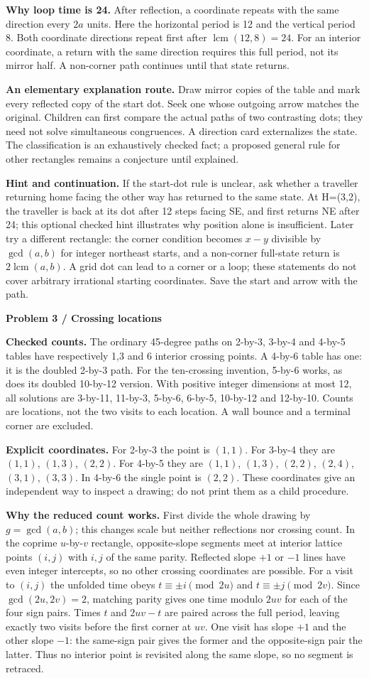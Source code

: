 \documentclass[11pt]{article}
\newcommand{\parttitle}[1]{{\large\bfseries\color{ink}#1}\par}
\newcommand{\labelled}[2]{\textbf{#1} #2\par}
\begin{document}
\labelled{Why loop time is 24.}{After reflection, a coordinate repeats with the same direction every $2a$ units. Here the horizontal period is 12 and the vertical period 8. Both coordinate directions repeat first after $\operatorname{lcm}(12,8)=24$. For an interior coordinate, a return with the same direction requires this full period, not its mirror half. A non-corner path continues until that state returns.}
\labelled{An elementary explanation route.}{Draw mirror copies of the table and mark every reflected copy of the start dot. Seek one whose outgoing arrow matches the original. Children can first compare the actual paths of two contrasting dots; they need not solve simultaneous congruences. A direction card externalizes the state. The classification is an exhaustively checked fact; a proposed general rule for other rectangles remains a conjecture until explained.}
\labelled{Hint and continuation.}{If the start-dot rule is unclear, ask whether a traveller returning home facing the other way has returned to the same state. At H=(3,2), the traveller is back at its dot after 12 steps facing SE, and first returns NE after 24; this optional checked hint illustrates why position alone is insufficient. Later try a different rectangle: the corner condition becomes $x-y$ divisible by $\gcd(a,b)$ for integer northeast starts, and a non-corner full-state return is $2\operatorname{lcm}(a,b)$. A grid dot can lead to a corner or a loop; these statements do not cover arbitrary irrational starting coordinates. Save the start and arrow with the path.}
\newpage
\parttitle{Problem 3 / Crossing locations}
\labelled{Checked counts.}{The ordinary 45-degree paths on 2-by-3, 3-by-4 and 4-by-5 tables have respectively 1,3 and 6 interior crossing points. A 4-by-6 table has one: it is the doubled 2-by-3 path. For the ten-crossing invention, 5-by-6 works, as does its doubled 10-by-12 version. With positive integer dimensions at most 12, all solutions are 3-by-11, 11-by-3, 5-by-6, 6-by-5, 10-by-12 and 12-by-10. Counts are locations, not the two visits to each location. A wall bounce and a terminal corner are excluded.}
\labelled{Explicit coordinates.}{For 2-by-3 the point is $(1,1)$. For 3-by-4 they are $(1,1)$, $(1,3)$, $(2,2)$. For 4-by-5 they are $(1,1)$, $(1,3)$, $(2,2)$, $(2,4)$, $(3,1)$, $(3,3)$. In 4-by-6 the single point is $(2,2)$. These coordinates give an independent way to inspect a drawing; do not print them as a child procedure.}
\labelled{Why the reduced count works.}{First divide the whole drawing by $g=\gcd(a,b)$; this changes scale but neither reflections nor crossing count. In the coprime $u$-by-$v$ rectangle, opposite-slope segments meet at interior lattice points $(i,j)$ with $i,j$ of the same parity. Reflected slope $+1$ or $-1$ lines have even integer intercepts, so no other crossing coordinates are possible. For a visit to $(i,j)$ the unfolded time obeys $t\equiv\pm i\pmod{2u}$ and $t\equiv\pm j\pmod{2v}$. Since $\gcd(2u,2v)=2$, matching parity gives one time modulo $2uv$ for each of the four sign pairs. Times $t$ and $2uv-t$ are paired across the full period, leaving exactly two visits before the first corner at $uv$. One visit has slope $+1$ and the other slope $-1$: the same-sign pair gives the former and the opposite-sign pair the latter. Thus no interior point is revisited along the same slope, so no segment is retraced.}
\end{document}
